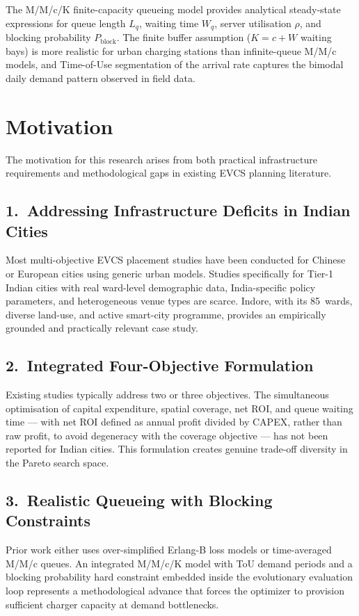The M/M/c/K finite-capacity queueing model provides analytical
steady-state expressions for queue length $L_q$, waiting time $W_q$,
server utilisation $\rho$, and blocking probability $P_{\text{block}}$.
The finite buffer assumption ($K = c + W$ waiting bays) is more realistic
for urban charging stations than infinite-queue M/M/c models, and
Time-of-Use segmentation of the arrival rate captures the bimodal daily
demand pattern observed in field data.

\section{Motivation}
\label{sec:intro_motivation}

The motivation for this research arises from both practical infrastructure
requirements and methodological gaps in existing EVCS planning literature.

\subsection*{1.~Addressing Infrastructure Deficits in Indian Cities}
Most multi-objective EVCS placement studies have been conducted for
Chinese or European cities using generic urban models. Studies specifically
for Tier-1 Indian cities with real ward-level demographic data, India-specific
policy parameters, and heterogeneous venue types are scarce. Indore, with
its 85~wards, diverse land-use, and active smart-city programme, provides
an empirically grounded and practically relevant case study.

\subsection*{2.~Integrated Four-Objective Formulation}
Existing studies typically address two or three objectives. The simultaneous
optimisation of capital expenditure, spatial coverage, net ROI, and queue
waiting time --- with net ROI defined as annual profit divided by CAPEX,
rather than raw profit, to avoid degeneracy with the coverage objective ---
has not been reported for Indian cities. This formulation creates genuine
trade-off diversity in the Pareto search space.

\subsection*{3.~Realistic Queueing with Blocking Constraints}
Prior work either uses over-simplified Erlang-B loss models or
time-averaged M/M/c queues. An integrated M/M/c/K model with ToU
demand periods and a blocking probability hard constraint embedded
inside the evolutionary evaluation loop represents a methodological
advance that forces the optimizer to provision sufficient charger
capacity at demand bottlenecks.

